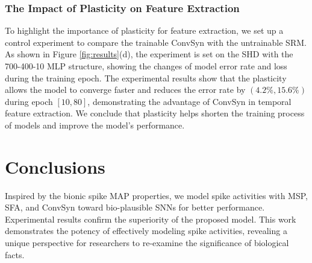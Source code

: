 \documentclass{article}
\begin{document}
\subsubsection{The Impact of Plasticity on Feature Extraction}
To highlight the importance of plasticity for feature extraction, we set up a control experiment to compare the trainable ConvSyn with the untrainable SRM. As shown in Figure \ref{fig:results}(d), the experiment is set on the SHD with the 700-400-10 MLP structure, showing the changes of model error rate and loss during the training epoch. The experimental results show that the plasticity allows the model to converge faster and reduces the error rate by $(4.2\%,15.6\%)$ during epoch $[10,80]$, demonstrating the advantage of ConvSyn in temporal feature extraction. We conclude that plasticity helps shorten the training process of models and improve the model's performance.


\section{Conclusions}
Inspired by the bionic spike MAP properties, we model spike activities with MSP, SFA, and ConvSyn toward bio-plausible SNNs for better performance. Experimental results confirm the superiority of the proposed model. This work demonstrates the potency of effectively modeling spike activities, revealing a unique perspective for researchers to re-examine the significance of biological facts.

\newpage


\end{document}
